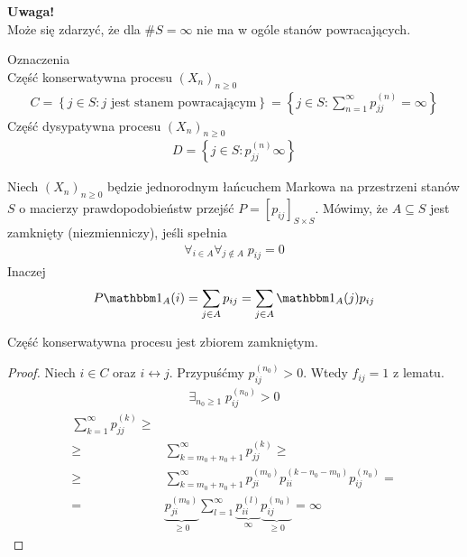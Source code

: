\textbf{Uwaga!}\\
Może się zdarzyć, że dla $ \#S=\infty  $ nie ma w ogóle stanów powracających.

Oznaczenia\\
Część konserwatywna procesu $ \left(X_n\right)_{n\ge 0} $
\begin{gather*}
C=\left\{j\in S:j\text{ jest stanem powracającym}\right\}=\left\{j\in S:\sum_{n=1}^{\infty }p_{jj}^{(n)}=\infty \right\}
\end{gather*}
Część dysypatywna procesu $ \left(X_n\right)_{n\ge 0} $
\begin{gather*}
D=\left\{j\in S:p_{jj}^{(n)}\infty \right\}
\end{gather*}
\begin{defi}
Niech $ \left(X_n\right)_{n\ge 0} $ będzie jednorodnym łańcuchem Markowa na przestrzeni stanów $ S $ o macierzy prawdopodobieństw przejść $ P=\left[p_{ij}\right] _{S\times S}$. Mówimy, że $ A\subseteq S $ jest zamknięty (niezmienniczy), jeśli spełnia
\begin{gather*}
\forall_{i\in A}\forall_{j\notin A}\;p_{ij}=0
\end{gather*}
Inaczej
\begin{gather*}
P\mathbbm1_{A}(i)=\sum_{j\in A}p_{ij}=\sum_{j\in A}\mathbbm1_{A}(j)p_{ij}
\end{gather*}
\end{defi}
\begin{twr}
Część konserwatywna procesu jest zbiorem zamkniętym.
\begin{proof}
Niech $ i\in C $ oraz $ i\longleftrightarrow j $. Przypuśćmy $ p_{ij}^{(n_0)}>0 $. Wtedy $ f_{ij}=1 $ z lematu.\begin{gather*}
\exists_{n_0\ge 1}\;p_{ij}^{(n_0)}>0
\end{gather*}
\begin{align*}
\sum_{k=1}^{\infty }p_{jj}^{(k)}
\ge\\\ge&
\sum_{k=m_0+n_0+1}^\infty p_{jj}^{(k)}
\ge\\\ge&
\sum_{k=m_0+n_0+1}^\infty p_{ji}^{(m_0)}p_{ii}^{(k-n_0-m_0)}p_{ij}^{(n_0)}
=\\=&
\underbrace{p_{ji}^{(m_0)}}_{\ge 0}
\sum_{l=1}^\infty
\underbrace{p_{ii}^{(l)}}_{\infty }
\underbrace{p_{ij}^{(n_0)}}_{\ge 0}
=\infty 
\end{align*}
\end{proof}
\end{twr}